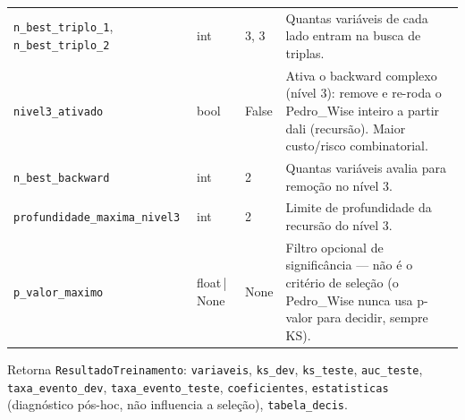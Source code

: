 \documentclass[11pt]{article}
\begin{document}
\begin{longtable}{P{4.3cm}P{1.8cm}P{1.4cm}P{6.2cm}}
\texttt{n\_best\_triplo\_1}, \texttt{n\_best\_triplo\_2} & int & 3, 3 & Quantas variáveis de cada lado entram na busca de triplas. \\
\texttt{nivel3\_ativado} & bool & False & Ativa o backward complexo (nível 3): remove e re-roda o Pedro\_Wise inteiro a partir dali (recursão). Maior custo/risco combinatorial. \\
\texttt{n\_best\_backward} & int & 2 & Quantas variáveis avalia para remoção no nível 3. \\
\texttt{profundidade\_maxima\_nivel3} & int & 2 & Limite de profundidade da recursão do nível 3. \\
\texttt{p\_valor\_maximo} & float\,|\,None & None & Filtro opcional de significância --- não é o critério de seleção (o Pedro\_Wise nunca usa p-valor para decidir, sempre KS). \\
\bottomrule
\end{longtable}

Retorna \texttt{ResultadoTreinamento}: \texttt{variaveis}, \texttt{ks\_dev},
\texttt{ks\_teste}, \texttt{auc\_teste}, \texttt{taxa\_evento\_dev},
\texttt{taxa\_evento\_teste}, \texttt{coeficientes}, \texttt{estatisticas}
(diagnóstico pós-hoc, não influencia a seleção), \texttt{tabela\_decis}.
\end{document}
